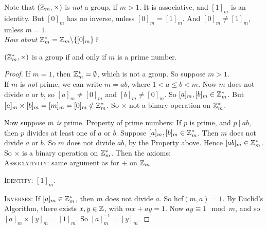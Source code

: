 \documentclass[10pt]{scrartcl}
\begin{document}
Note that $(\mathbb{Z}_m,\times)$ is \emph{not} a group, if $m > 1$. It is associative, and $[1]_m$ is an identity. But $[0]_m$ has no inverse, unless $[0]_m = [1]_m$. And $[0]_m \neq [1]_m$, unless $m =1 $.\\

\textit{How about $\mathbb{Z}^{*}_m = \mathbb{Z}_m \backslash\{[0]_m\}$?}\\

\begin{proposition}$(\mathbb{Z}_m^{*},\times)$ is a group if and only if $m$ is a prime number.	
\end{proposition}


\begin{proof}
If $m = 1$, then $\mathbb{Z}_m^* = \emptyset$, which is not a group. So suppose $m > 1$.\\ If $m$ is \emph{not} prime, we can write $m = ab$, where $1 < a \leq b < m$. Now $m$ does not divide $a$ or $b$, so $[a]_m \neq [0]_m$ and $[b]_m \neq [0]_m$. So $[a]_m, [b]_m \in \mathbb{Z}_m^*$. But $[a]_m \times [b]_m = [m]_m = [0]_m \notin \mathbb{Z}_m^*$. So $\times$ not a binary operation on $\mathbb{Z}_m^*$. 

Now suppose $m$ \emph{is} prime. Property of prime numbers: If $p$ is prime, and $p ~|~ ab$, then $p$ divides at least one of $a$ or $b$. Suppose $[a]_m,[b]_m \in \mathbb{Z}_m^*$. Then $m$ does not divide $a$ or $b$. So $m$ does not divide $ab$, by the Property above. Hence $[ab]_m \in \mathbb{Z}_m^*$. So $\times$ is a binary operation on $\mathbb{Z}_m^*$. Then the axioms:\\

\textsc{Associativity:} same argument as for $+$ on $\mathbb{Z}_m$\\ \vspace*{-10pt}

\textsc{Identity:} $[1]_m$.\\ \vspace*{-10pt}

\textsc{Inverses:} If $[a]_m \in \mathbb{Z}_m^*$, then $m$ does not divide $a$. So hcf$(m,a)= 1$. By Euclid's Algorithm, there exists $x,y \in \mathbb{Z}$, with $mx + ay = 1$. Now $ay \equiv 1 \mod m$, and so $[a]_m\times [y]_m = [1]_m$. So $[a]_m^{-1} = [y]_m$.
\end{proof}\vspace*{10pt}
\end{document}
